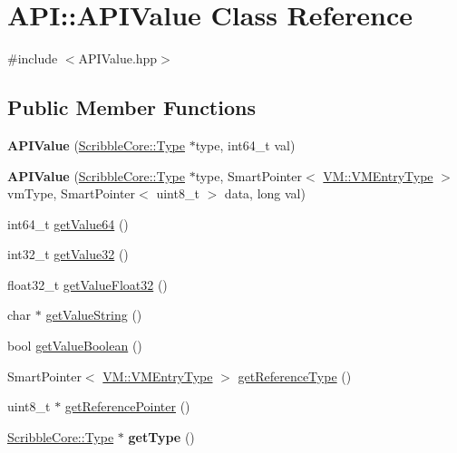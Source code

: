\hypertarget{class_a_p_i_1_1_a_p_i_value}{\section{A\-P\-I\-:\-:A\-P\-I\-Value Class Reference}
\label{class_a_p_i_1_1_a_p_i_value}
}


{\ttfamily \#include $<$A\-P\-I\-Value.\-hpp$>$}

\subsection*{Public Member Functions}
\begin{DoxyCompactItemize}
\item 
\hypertarget{class_a_p_i_1_1_a_p_i_value_aa9c18784d818a39bf8ff1f91a5a9fa44}{{\bfseries A\-P\-I\-Value} (\hyperlink{class_scribble_core_1_1_type}{Scribble\-Core\-::\-Type} $\ast$type, int64\-\_\-t val)}\label{class_a_p_i_1_1_a_p_i_value_aa9c18784d818a39bf8ff1f91a5a9fa44}

\item 
\hypertarget{class_a_p_i_1_1_a_p_i_value_ac6a9936ffcc934fd6e16fa9d26d2732c}{{\bfseries A\-P\-I\-Value} (\hyperlink{class_scribble_core_1_1_type}{Scribble\-Core\-::\-Type} $\ast$type, Smart\-Pointer$<$ \hyperlink{class_v_m_1_1_v_m_entry_type}{V\-M\-::\-V\-M\-Entry\-Type} $>$ vm\-Type, Smart\-Pointer$<$ uint8\-\_\-t $>$ data, long val)}\label{class_a_p_i_1_1_a_p_i_value_ac6a9936ffcc934fd6e16fa9d26d2732c}

\item 
int64\-\_\-t \hyperlink{class_a_p_i_1_1_a_p_i_value_a26380a603f4fc9191608f047e6ea8250}{get\-Value64} ()
\item 
int32\-\_\-t \hyperlink{class_a_p_i_1_1_a_p_i_value_ae56a74e043a259b1a219804cb77165d7}{get\-Value32} ()
\item 
float32\-\_\-t \hyperlink{class_a_p_i_1_1_a_p_i_value_a2374ba437041f0c57514be649825312b}{get\-Value\-Float32} ()
\item 
char $\ast$ \hyperlink{class_a_p_i_1_1_a_p_i_value_a94eb3d9f4b1c0dfd397f6813fd8c8a94}{get\-Value\-String} ()
\item 
bool \hyperlink{class_a_p_i_1_1_a_p_i_value_a720e381988acbc87b34df8535d61e4d2}{get\-Value\-Boolean} ()
\item 
Smart\-Pointer$<$ \hyperlink{class_v_m_1_1_v_m_entry_type}{V\-M\-::\-V\-M\-Entry\-Type} $>$ \hyperlink{class_a_p_i_1_1_a_p_i_value_adffeaebde4496d5ee7e9944f1aa4bb76}{get\-Reference\-Type} ()
\item 
uint8\-\_\-t $\ast$ \hyperlink{class_a_p_i_1_1_a_p_i_value_afaee05a374fbc7e04c9ceb9f4b0758af}{get\-Reference\-Pointer} ()
\item 
\hypertarget{class_a_p_i_1_1_a_p_i_value_a50687d887d23aabffd1f9df7f3ba94a1}{\hyperlink{class_scribble_core_1_1_type}{Scribble\-Core\-::\-Type} $\ast$ {\bfseries get\-Type} ()}\label{class_a_p_i_1_1_a_p_i_value_a50687d887d23aabffd1f9df7f3ba94a1}


\end{DoxyCompactItemize}
